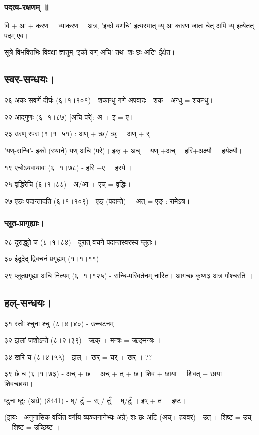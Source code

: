 \documentclass[oneside, article]{memoir}
\begin{document}
\subsubsection{पदत्व-रक्षणम् ॥}
वि + आ + करण = व्याकरण । अत्र, 'इको यणचि' इत्यस्मात् व्य् आ कारण जातः चेत् अपि व्य् इत्येतत् पदम् एव।

सूत्रे विभक्तिभिः विवक्षा ज्ञातुम् 'इको यण् अचि' तथ 'शः छः अटि' ईक्षेत।

\subsection{स्वर-सन्धयः।}
२६ अकः सवर्णे दीर्घः (६।१।१०१)  - शकान्धु-गणे अपवादः - शक +अन्धु = शकन्धु।

२२ आद्गुणः (६।१।८७) [अचि परे]: अ + इ = ए।

२३ उरण् रपरः (१।१।५१) : अण् + ऋ/ ॠ = अण् + र्
 
'यण्-सन्धि'- इको (स्थाने) यण् अचि (परे)। इक् + अच् = यण् +अच् । हरि+अक्ष्यौ = हर्यक्ष्यौ।

१९ एचोऽयवायावः (६।१।७८) - हरि +ए = हरये ।

२५ वृद्धिरेचि (६।१।८८) - अ/आ + एच् = वृद्धिः।

२७ एङः पदान्तादति (६।१।१०९) - एङ् (पदान्ते) + अत् = एङ् : रामेऽत्र।

\subsubsection{प्लुत-प्रागृह्याः।}
२८ दूराद्धूते च (८।१।८४) - दूरात् वचने पदान्तस्वरस्य प्लुतः।

३० ईदूदेद् द्विवचनं प्रगृह्यम् (१।१।११)

२९ प्लुतप्रगृह्या अचि नित्यम् (६।१।१२५) - सन्धि-परिवर्तनम् नास्ति। आगच्छ कृष्ण३ अत्र गौश्चरति ।

\subsection{हल्-सन्धयः।}
३१ स्तोः श्चुना श्चुः (८।४।४०) - उच्चटनम्

३२ झलां जशोऽन्ते (८।२।३९) - ऋक् + मन्त्रः = ऋङ्मन्त्रः ।

३४ खरि च (८।४।५५) - झल् + खर् = चर् + खर् । ??

३९ छे च (६।१।७३)  - अच् + छ = अच् + त् + छ। शिव + छाया = शिवत् + छाया = शिवच्छाया।

ष्टुना ष्टु: (अग्रे) (8\.4\.41) - ष्/ टुँ + स् / तुँ = ष्/टुँ । इष् + त = इष्ट।

(झयः - अनुनासिक-वर्जित-वर्गीय-व्यञ्जनानेभ्यः अग्रे) शः छः अटि (अच्+ हयवर)। उत् + शिष्ट = उच् + शिष्ट = उच्छिष्ट ।
\end{document}
